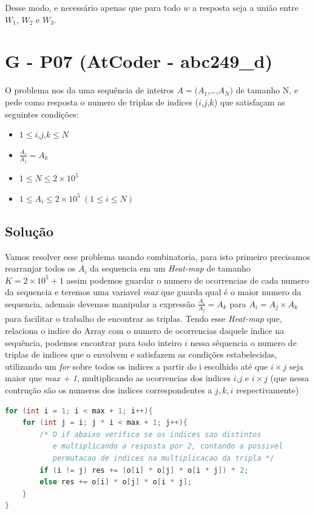 \documentclass[12pt,a4paper]{article}
\begin{document}
Desse modo, e necessário apenas que para todo $w$ a resposta seja a união entre $W_1$, $W_2$ e $W_3$. 

\section{G - P07 (AtCoder - abc249\_d)}

O problema nos da uma sequência de inteiros $A = (A_1$,\dots,$A_N)$ de tamanho N, e pede como resposta o numero de triplas de indices ($i$,$j$,$k$)
que satisfaçam as seguintes condições:
\begin{itemize}
    \item $1 \le i$,$j$,$k \le N $
    \item $\frac{A_i}{A_j} = A_k$ 
    \item $1 \le N \le 2 \times 10^5$
    \item $1 \le A_i \le 2 \times 10^5 \ (1 \le i \le N)$
\end{itemize} 

\subsection{Solução}

Vamos resolver esse problema usando combinatoria, para isto primeiro precisamos rearranjar todos os $A_i$ da sequencia em um \textit{Heat-map} de tamanho
$K = 2 \times 10^5 + 1$ assim podemos guardar o numero de ocorrencias de cada numero da sequencia e teremos uma variavel \textit{max} que guarda qual é o maior
numero da sequencia, ademais devemos manipular a expressão $\frac{A_i}{A_j} = A_k$ para $A_i = A_j \times A_k$ para facilitar o trabalho de encontrar as triplas. 
Tendo esse \textit{Heat-map} que, relaciona o indice do Array com o numero de ocorrencias daquele índice na sequência, podemos encontrar para todo inteiro $i$ nessa 
sêquencia o numero de triplas de indices que o envolvem e satisfazem as condições estabelecidas, utilizando um \textit{for} sobre todos os indices a partir do i escolhido até que
$i \times j$ seja maior que \textit{max + 1}, multiplicando as ocorrencias dos indices $i$,$j$ e $i \times j$ 
(que nessa contrução são os numeros dos indices correspondentes a $j,k,i$ respectivamente)

\vspace{0.5cm} 

\begin{lstlisting}[language=C++]
for (int i = 1; i < max + 1; i++){
    for (int j = i; j * i < max + 1; j++){
        /* O if abaixo verifica se os indices sao distintos
           e multiplicando a resposta por 2, contando a possivel
           permutacao de indices na multiplicacao da tripla */
        if (i != j) res += (o[i] * o[j] * o[i * j]) * 2; 
        else res += o[i] * o[j] * o[i * j];
    }
}
\end{lstlisting}
\end{document}
